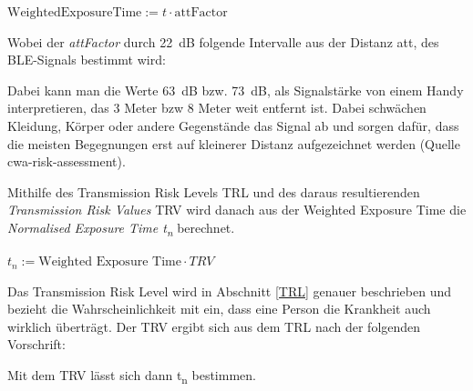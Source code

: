 \documentclass[conference,compsoc]{IEEEtran}
\begin{document}
\centerline{\text{ }}
\centerline{$\text{WeightedExposureTime} := t \cdot \text{attFactor}$}
\centerline{\text{ }}

Wobei der \textit{attFactor} durch \SI{22}{dB} folgende Intervalle aus der Distanz att, des BLE-Signals bestimmt wird:


\centerline{\text{ }}




\centerline{\text{ }}

Dabei kann man die Werte \SI{63}{dB} bzw. \SI{73}{dB}, als Signalstärke von einem Handy interpretieren, das 3 Meter bzw 8 Meter weit entfernt ist. 
Dabei schwächen Kleidung, Körper oder andere Gegenstände das Signal ab und sorgen dafür, dass die meisten Begegnungen erst auf kleinerer Distanz aufgezeichnet werden \cite{}(Quelle cwa-risk-assessment).

Mithilfe des Transmission Risk Levels TRL und des daraus resultierenden \textit{Transmission Risk Values} TRV wird danach aus der Weighted Exposure Time die \textit{Normalised Exposure Time t\textsubscript{­n}} berechnet.

\centerline{\text{ }}
\centerline{$t_n := \text{Weighted Exposure Time}\cdot TRV$}
\centerline{\text{ }}

Das Transmission Risk Level wird in Abschnitt \ref{TRL} genauer beschrieben und bezieht die Wahrscheinlichkeit mit ein, dass eine Person die Krankheit auch wirklich überträgt. 
Der TRV ergibt sich aus dem TRL nach der folgenden Vorschrift:

\centerline{\text{ }}








\centerline{\text{ }}

Mit dem TRV lässt sich dann t\textsubscript{n} bestimmen.
\end{document}
